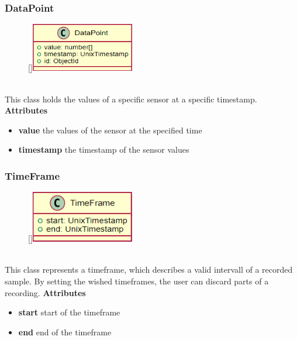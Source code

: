 \newpage
\subsubsection{DataPoint}
\label{DataPoint}
\begin{figure}
    \raisebox{0pt}[\dimexpr{}\baselineskip\relax]{\includegraphics[width=4.5cm]{classes/workspace-management/9.png}}
\end{figure} 
~\\
This class holds the values of a specific sensor at a specific timestamp.
\newline
\newline
\newline
\newline
\textbf{Attributes}
\begin{itemize}
    \item \textbf{value} the values of the sensor at the specified time
    \item \textbf{timestamp} the timestamp of the sensor values
\end{itemize}

\subsubsection{TimeFrame}
\label{TimeFrame}
\begin{figure}
    \raisebox{0pt}[\dimexpr{}\baselineskip\relax]{\includegraphics[width=4.5cm]{classes/workspace-management/10.png}}
\end{figure} 
~\\
This class represents a timeframe, which describes a valid intervall of a recorded sample. By setting the wished timeframes, the user can discard parts of a recording.
\newline
\newline
\newline
\textbf{Attributes}
\begin{itemize}
    \item \textbf{start} start of the timeframe
    \item \textbf{end} end of the timeframe
\end{itemize}

